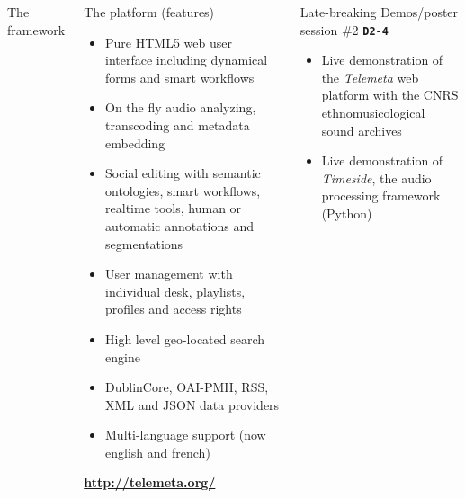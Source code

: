 \documentclass[final, hyperref, table]{beamer} \mode<presentation>
\begin{document}
\begin{frame}
\begin{columns}
\begin{block}{The framework}
    \end{block}


    \column[t]{6cm}
    \begin{block}{The platform (features)}
      \begin{itemize}
        \setlength{\itemsep}{1.5pt}
      \item Pure HTML5 web user interface including dynamical forms
        and smart workflows
      \item On the fly audio analyzing, transcoding and metadata
        embedding
      \item Social editing with semantic ontologies, smart workflows,
        realtime tools, human or automatic annotations and
        segmentations
      \item User management with individual desk, playlists, profiles
        and access rights
      \item High level geo-located search engine
      \item DublinCore, OAI-PMH, RSS, XML and JSON data providers
      \item Multi-language support (now english and french)
      \end{itemize}
      \vspace{-0.6cm}
      \begin{center}
        \colorbox{yellow!50}{\textbf{\url{http://telemeta.org/}}}
      \end{center}
    \end{block}
    \vspace{-0.2cm}
    \begin{block}{Late-breaking Demos/poster session \#2
        \texttt{\textbf{D2-4}}}
      \begin{itemize}
      \item Live demonstration of the \emph{Telemeta} web platform
        with the CNRS \alert{ethnomusicological sound archives}
      \item Live demonstration of \emph{Timeside}, the audio
        processing framework (Python)
      \end{itemize}
    \end{block}

  \end{columns}
\end{frame}
\end{document}
